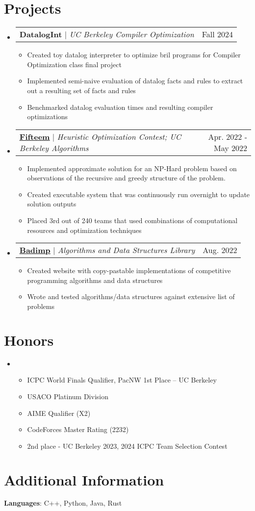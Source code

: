 \documentclass[letterpaper,11pt]{article}
\makeatletter
\newcommand{\resumeItem}[1]{
  \item\small{
    {#1 \vspace{-2pt}}
  }
}
\newcommand{\resumeProjectHeading}[2]{
    \item
    \begin{tabular*}{0.97\textwidth}{l@{\extracolsep{\fill}}r}
      \small#1 & #2 \\
    \end{tabular*}\vspace{-7pt}
}
\newcommand{\resumeSubHeadingListStart}{\begin{itemize}[leftmargin=0.15in, label={}]}
\newcommand{\resumeSubHeadingListEnd}{\end{itemize}}
\newcommand{\resumeItemListStart}{\begin{itemize}}
\newcommand{\resumeItemListEnd}{\end{itemize}\vspace{-5pt}}
\makeatother
\begin{document}
\section{Projects}
\resumeSubHeadingListStart
\resumeProjectHeading
{\textbf{DatalogInt} $|$ \emph{UC Berkeley Compiler Optimization}}{Fall 2024}
\resumeItemListStart
\resumeItem{Created toy datalog interpreter to optimize bril programs for Compiler Optimization class final project}
\resumeItem{Implemented semi-naive evaluation of datalog facts and rules to extract out a resulting set of facts and rules}
\resumeItem{Benchmarked datalog evaluation times and resulting compiler optimizations}
\resumeItemListEnd
\resumeProjectHeading
{\href{https://github.com/ernest-lu/Fifteem/blob/main/projectreflection.pdf}{\underline{\textbf{Fifteem}}} $|$ \emph{Heuristic Optimization Contest; UC Berkeley Algorithms}}{Apr. 2022 - May 2022}
\resumeItemListStart
\resumeItem{Implemented approximate solution for an NP-Hard problem based on observations of the recursive and greedy structure of the problem.}
\resumeItem{Created executable system that was continuously run overnight to update solution outputs}
\resumeItem{Placed 3rd out of 240 teams that used combinations of computational resources and optimization techniques}
\resumeItemListEnd
\resumeProjectHeading
{\href{https://badimp.vercel.app/}{\underline{\textbf{Badimp}}} $|$ \emph{Algorithms and Data Structures Library}}{Aug. 2022}
\resumeItemListStart
\resumeItem{Created website with copy-pastable implementations of competitive programming algorithms and data structures}
\resumeItem{Wrote and tested algorithms/data structures against extensive list of problems}
\resumeItemListEnd
\resumeSubHeadingListEnd

\section{Honors}
\resumeSubHeadingListStart
\item{}
\resumeItemListStart
\resumeItem{ICPC World Finals Qualifier, PacNW 1st Place – UC Berkeley}
\resumeItem{USACO Platinum Division}
\resumeItem{AIME Qualifier (X2)}
\resumeItem{CodeForces Master Rating (2232)}
\resumeItem{2nd place - UC Berkeley 2023, 2024 ICPC Team Selection Contest}
\resumeItemListEnd
\resumeSubHeadingListEnd


%
\section{Additional Information}
\begin{itemize}[leftmargin=0.15in, label={}]
  \small{\item{
                \textbf{Languages}{: C++, Python, Java, Rust} \\
          }}
\end{itemize}


\end{document}
